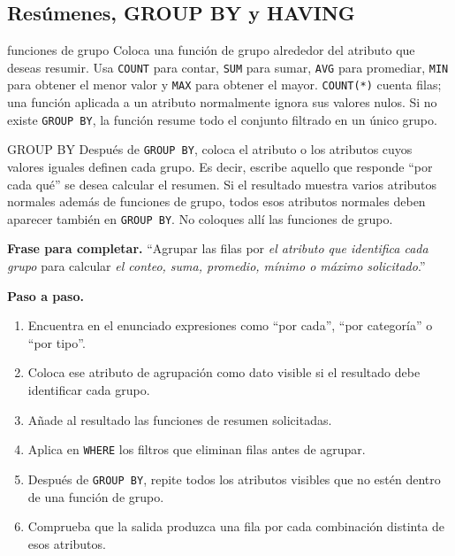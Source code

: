 \documentclass[11pt,a4paper]{article}
\newcommand{\campo}[1]{\texttt{#1}}
\begin{document}
\subsection{Resúmenes, GROUP BY y HAVING}

\begin{plantilla}{funciones de grupo}
Coloca una función de grupo alrededor del atributo que deseas resumir. Usa \campo{COUNT} para contar,
\campo{SUM} para sumar, \campo{AVG} para promediar, \campo{MIN} para obtener el menor valor y
\campo{MAX} para obtener el mayor. \campo{COUNT(*)} cuenta filas; una función aplicada a un atributo
normalmente ignora sus valores nulos. Si no existe \campo{GROUP BY}, la función resume todo el
conjunto filtrado en un único grupo.
\end{plantilla}

\begin{plantilla}{GROUP BY}
Después de \campo{GROUP BY}, coloca el atributo o los atributos cuyos valores iguales definen cada
grupo. Es decir, escribe aquello que responde ``por cada qué'' se desea calcular el resumen. Si el
resultado muestra varios atributos normales además de funciones de grupo, todos esos atributos
normales deben aparecer también en \campo{GROUP BY}. No coloques allí las funciones de grupo.

\textbf{Frase para completar.} ``Agrupar las filas por \emph{el atributo que identifica cada grupo}
para calcular \emph{el conteo, suma, promedio, mínimo o máximo solicitado}.''

\textbf{Paso a paso.}
\begin{enumerate}[label=\arabic*.]
  \item Encuentra en el enunciado expresiones como ``por cada'', ``por categoría'' o ``por tipo''.
  \item Coloca ese atributo de agrupación como dato visible si el resultado debe identificar cada
  grupo.
  \item Añade al resultado las funciones de resumen solicitadas.
  \item Aplica en \campo{WHERE} los filtros que eliminan filas antes de agrupar.
  \item Después de \campo{GROUP BY}, repite todos los atributos visibles que no estén dentro de una
  función de grupo.
  \item Comprueba que la salida produzca una fila por cada combinación distinta de esos atributos.
\end{enumerate}
\end{plantilla}
\end{document}
